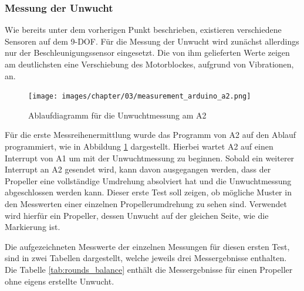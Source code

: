 \subsubsection*{Messung der Unwucht}
Wie bereits unter dem vorherigen Punkt beschrieben, existieren verschiedene Sensoren auf dem \ac{9-DOF}.
Für die Messung der Unwucht wird zunächst allerdings nur der Beschleunigungssensor eingesetzt.
Die von ihm gelieferten Werte zeigen am deutlichsten eine Verschiebung des Motorblockes, aufgrund von Vibrationen, an.

\begin{figure}[H]
	\centering
	\texttt{[image: images/chapter/03/measurement\_arduino\_a2.png]}
	\caption{Ablaufdiagramm für die Unwuchtmessung am \ac{A2}}
	\label{fig:sequence_measure_a2}
\end{figure}

Für die erste Messreihenermittlung wurde das Programm von \ac{A2} auf den Ablauf programmiert, wie in Abbildung \ref{fig:sequence_measure_a2} dargestellt.
Hierbei wartet \ac{A2} auf einen Interrupt von \ac{A1} um mit der Unwuchtmessung zu beginnen.
Sobald ein weiterer Interrupt an \ac{A2} gesendet wird, kann davon ausgegangen werden, dass der Propeller eine vollständige Umdrehung absolviert hat und die Unwuchtmessung abgeschlossen werden kann.
Dieser erste Test soll zeigen, ob mögliche Muster in den Messwerten einer einzelnen Propellerumdrehung zu sehen sind.
Verwendet wird hierfür ein Propeller, dessen Unwucht auf der gleichen Seite, wie die Markierung ist.

Die aufgezeichneten Messwerte der einzelnen Messungen für diesen ersten Test, sind in zwei Tabellen dargestellt, welche jeweils drei Messergebnisse enthalten. Die Tabelle \ref{tab:rounds_balance} enthält die Messergebnisse für einen Propeller ohne eigens erstellte Unwucht.

\begin{table}[H]
\centering
{}
\caption{Messergebnisse von Propellerumdrehungen ohne Unwucht}
\label{tab:rounds_balance}
\end{table}

